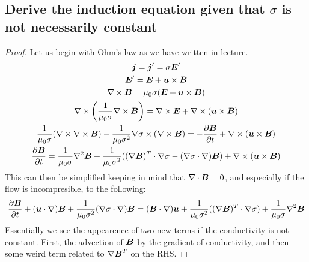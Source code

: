 \documentclass{article}
\begin{document}
\subsection{Derive the induction equation given that $\sigma$ is not necessarily
constant}
\begin{proof}
    Let us begin with Ohm's law as we have written in lecture. 
    \begin{gather*}
        \boldsymbol{j} = \boldsymbol{j}' = \sigma\boldsymbol{E}'\\
        \boldsymbol{E}' = \boldsymbol{E} + \boldsymbol{u}\times\boldsymbol{B}\\
        \nabla\times\boldsymbol{B} = \mu_0\sigma(\boldsymbol{E} + \boldsymbol{u}\times\boldsymbol{B})\\
        \nabla\times\left(\frac{1}{\mu_0\sigma}\nabla\times\boldsymbol{B}\right) =
        \nabla\times\boldsymbol{E} + \nabla\times(\boldsymbol{u}\times\boldsymbol{B})\\
        \frac{1}{\mu_0\sigma}(\nabla\times\nabla\times\boldsymbol{B}) - 
        \frac{1}{\mu_0\sigma^2}\nabla\sigma\times\left(\nabla\times\boldsymbol{B}\right) = 
        -\frac{\partial \boldsymbol{B}}{\partial t} + \nabla\times(\boldsymbol{u}\times\boldsymbol{B})\\
        \frac{\partial \boldsymbol{B}}{\partial t} = 
        \frac{1}{\mu_0\sigma}\nabla^2\boldsymbol{B} + 
        \frac{1}{\mu_0\sigma^2}((\nabla\boldsymbol{B})^T\cdot\nabla\sigma -
        (\nabla\sigma\cdot\nabla)\boldsymbol{B})
         + \nabla\times(\boldsymbol{u}\times\boldsymbol{B})
    \end{gather*}
    This can then be simplified keeping in mind that $\nabla \cdot{\boldsymbol{B}} = 0$, and
    especially if the flow is incompresible, to the following:
    \begin{gather*}
        \frac{\partial \boldsymbol{B}}{\partial t} + (\boldsymbol{u}\cdot\nabla)\boldsymbol{B} +
        \frac{1}{\mu_0\sigma^2}(\nabla\sigma\cdot\nabla)\boldsymbol{B} = 
        (\boldsymbol{B}\cdot\nabla)\boldsymbol{u} + 
        \frac{1}{\mu_0\sigma^2}((\nabla\boldsymbol{B})^T\cdot\nabla\sigma) + 
        \frac{1}{\mu_0\sigma}\nabla^2\boldsymbol{B} 
    \end{gather*}
    Essentially we see the appearence of two new terms if the conductivity is
    not constant. First, the advection of
    $\boldsymbol{B}$ by the gradient of conductivity, and then some weird term related to
    $\nabla\boldsymbol{B}^T$ on the RHS. 
\end{proof}

\section{}
\end{document}
